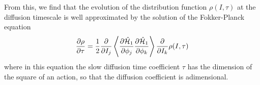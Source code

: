 

From this, we find that the evolution of the distribution function \(\rho(I,\tau)\) at the diffusion timescale is well approximated by the solution of the Fokker-Planck equation
\begin{equation}
	\pdv{\rho}{\tau}=\frac{1}{2}\pdv{}{I_j}\left\langle\pdv{\hat{\mathcal{H}}_1}{\phi_j}\pdv{\hat{\mathcal{H}}_1}{\phi_k}\right\rangle\pdv{}{I_k}\rho(I,\tau)
\end{equation}
where in this equation the slow diffusion time coefficient \(\tau\) has the dimension of the square of an action, so that the diffusion coefficient is adimensional.



